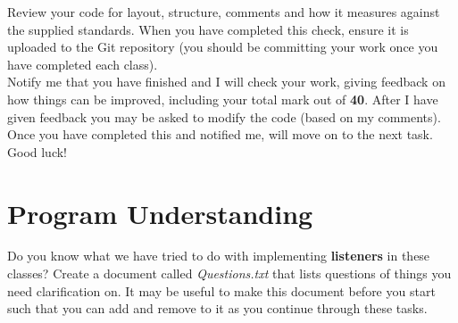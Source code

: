\documentclass[a4paper,12pt]{article}
\begin{document}
Review your code for layout, structure, comments and how it measures against the supplied standards. When you have completed this check, ensure it is uploaded to the Git repository (you should be committing your work once you have completed each class).\\

Notify me that you have finished and I will check your work, giving feedback on how things can be improved, including your total mark out of {\bf 40}. After I have given feedback you may be asked to modify the code (based on my comments). Once you have completed this and notified me, will move on to the next task. Good luck!

\vspace{0.5cm}
\section{Program Understanding}
Do you know what we have tried to do with implementing {\bf listeners} in these classes? Create a document called \textit{Questions.txt} that lists questions of things you need clarification on. It may be useful to make this document before you start such that you can add and remove to it as you continue through these tasks.
\end{document}
